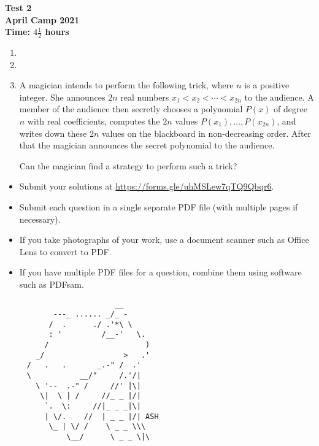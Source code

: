 \documentclass{article}
\begin{document}
\thispagestyle{empty}

\begin{center}
  \textbf{\Large Test 2}
  \\ \vspace{1em}
  \textbf{\large April Camp 2021}
  \\ \vspace{1em}
  \textbf{\large Time: $4\frac{1}{2}$ hours}
\end{center}

\vspace{24pt}

\begin{enumerate}[itemsep=18pt]

\item


\item


\item %
A magician intends to perform the following trick, where $n$ is a positive integer.
She announces $2n$ real numbers $x_1 < x_2 < \dotsb < x_{2n}$ to the audience.
A member of the audience then secretly chooses a polynomial $P(x)$ of degree $n$ with real coefficients, computes the $2n$ values $P(x_1), \dotsc, P(x_{2n})$, and writes down these $2n$ values on the blackboard in non-decreasing order.
After that the magician announces the secret polynomial to the audience.

Can the magician find a strategy to perform such a trick?

\end{enumerate}


\vfill
\begin{itemize}
	\item Submit your solutions at \url{https://forms.gle/uhMSLew7qTQ9Qbqr6}.
	\item Submit each question in a single separate PDF file (with multiple pages if necessary).
	\item If you take photographs of your work, use a document scanner such as Office Lens to convert to PDF.
	\item If you have multiple PDF files for a question, combine them using software such as PDFsam.
\end{itemize}

\vfill
\centering
\begin{BVerbatim}
                         __
           ---_ ...... _/_ -
          /  .      ./ .'*\ \
          : '         /__-'   \.
         /                      )
       _/                  >   .'
     /   .   .       _.-" /  .'
     \           __/"     /.'/|
       \ '--  .-" /     //' |\|
        \|  \ | /     //_ _ |/|
         `.  \:     //|_ _ _|\|
         | \/.    //  | _ _ |/| ASH
          \_ | \/ /    \ _ _ \\\
              \__/      \ _ _ \|\
\end{BVerbatim}
\end{document}
